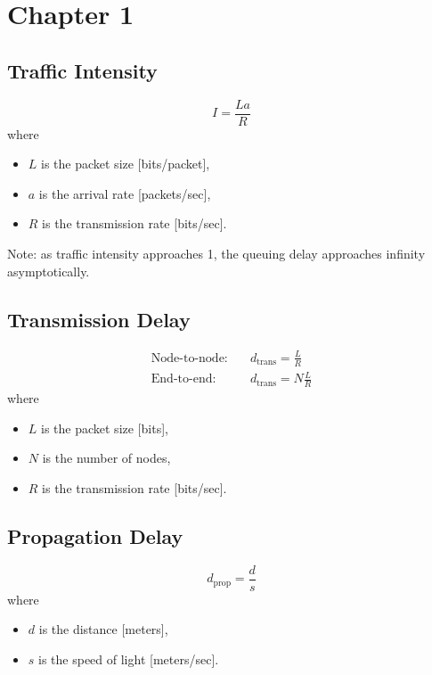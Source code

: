 \section{Chapter 1}

\subsection{Traffic Intensity}
\begin{equation*}
    I = \frac{La}{R}
\end{equation*}
where
\begin{itemize}
    \item $L$ is the packet size [bits/packet],
    \item $a$ is the arrival rate [packets/sec],
    \item $R$ is the transmission rate [bits/sec].
\end{itemize}
Note: as traffic intensity approaches 1, the queuing delay approaches infinity asymptotically.

\subsection{Transmission Delay}
\begin{align*}
    \text{Node-to-node:}\quad & d_\text{trans} = \frac{L}{R}  \\
    \text{End-to-end:}\quad   & d_\text{trans} = N\frac{L}{R}
\end{align*}
where
\begin{itemize}
    \item $L$ is the packet size [bits],
    \item $N$ is the number of nodes,
    \item $R$ is the transmission rate [bits/sec].
\end{itemize}

\subsection{Propagation Delay}
\begin{equation*}
    d_\text{prop} = \frac{d}{s}
\end{equation*}
where
\begin{itemize}
    \item $d$ is the distance [meters],
    \item $s$ is the speed of light [meters/sec].
\end{itemize}

